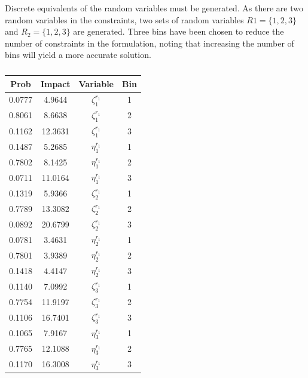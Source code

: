 \documentclass[a4paper,11pt]{article}
\begin{document}
Discrete equivalents of the random variables must be generated. As there are two random variables in the constraints, two sets of random variables $R1=\{1,2,3\}$ and $R_2=\{1,2,3\}$ are generated. Three bins have been chosen to reduce the number of constraints in the formulation, noting that increasing the number of bins will yield a more accurate solution.


\begin{table}[]
\centering
\begin{tabular}{cccc}
\hline
\textbf{Prob} & \textbf{Impact} & \textbf{Variable} & \textbf{Bin}\\
\hline
0.0777        & 4.9644          & $\zeta_1^{r_1}$        &       1        \\
0.8061        & 8.6638          & $\zeta_1^{r_1}$         &       2       \\
0.1162        & 12.3631         & $\zeta_1^{r_1}$          &       3       \\
0.1487        & 5.2685          & $\eta_1^{r_1}$            &     1       \\
0.7802        & 8.1425          & $\eta_1^{r_1}$           &      2       \\
0.0711        & 11.0164         & $\eta_1^{r_1}$           &      3       \\
0.1319        & 5.9366          & $\zeta_2^{r_1}$          &      1        \\
0.7789        & 13.3082         & $\zeta_2^{r_1}$          &      2        \\
0.0892        & 20.6799         & $\zeta_2^{r_1}$          &      3        \\
0.0781        & 3.4631          & $\eta_2^{r_1}$           &      1       \\
0.7801        & 3.9389          & $\eta_2^{r_1}$           &      2       \\
0.1418        & 4.4147          & $\eta_2^{r_1}$           &      3       \\
0.1140        & 7.0992          & $\zeta_3^{r_1}$          &      1        \\
0.7754        & 11.9197         & $\zeta_3^{r_1}$          &      2        \\
0.1106        & 16.7401         & $\zeta_3^{r_1}$          &      3        \\
0.1065        & 7.9167          & $\eta_3^{r_1}$           &      1       \\
0.7765        & 12.1088         & $\eta_3^{r_1}$           &      2       \\
0.1170        & 16.3008         & $\eta_3^{r_1}$           & 	  3		\\
\hline                 
\end{tabular}
\caption{}
\label{tab:q2ProbSummary}
\end{table}
\end{document}
